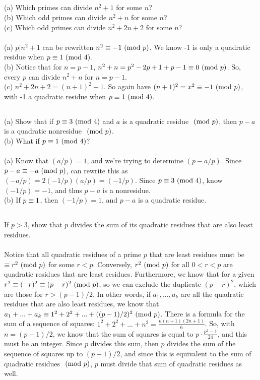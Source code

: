 \documentclass{article} \usepackage{amsmath}
\begin{document}
\subsection{}
(a) Which primes can divide $n^2 + 1$ for some $n$?\\
(b) Which odd primes can divide $n^2 + n$ for some $n$?\\
(c) Which odd primes can divide $n^2 + 2n + 2$ for some $n$?\\~\\
(a) $p|n^2 + 1$ can be rewritten $n^2 \equiv -1 \ (\mathrm{mod}\ p)$.
We know -1 is only a quadratic residue when $p \equiv 1 \ (\mathrm{mod}\ 4)$.\\
(b) Notice that for $n = p - 1$, $n^2 + n = p^2 - 2p + 1 + p - 1 \equiv 0 \ (\mathrm{mod}\ p)$.
So, every $p$ can divide $n^2 + n$ for $n = p - 1$.\\
(c) $n^2 + 2n + 2 = (n + 1)^2 + 1$.
So again have $(n + 1)^2 = x^2 \equiv -1 \ (\mathrm{mod}\ p)$, with -1 a quadratic residue
when $p \equiv 1 \ (\mathrm{mod}\ 4)$.

\subsection{}
(a) Show that if $p \equiv 3 \ (\mathrm{mod}\ 4)$ and $a$ is a quadratic residue $\ (\mathrm{mod}\ p)$,
then $p - a$ is a quadratic nonresidue $\ (\mathrm{mod}\ p)$.\\
(b) What if $p \equiv 1 \ (\mathrm{mod}\ 4)$?\\~\\
(a) Know that $(a/p) = 1$, and we're trying to determine $(p - a/p)$.
Since $p - a \equiv -a \ (\mathrm{mod}\ p)$, can rewrite this as $(-a/p) = 2(-1/p)(a/p) = (-1/p)$.
Since $p \equiv 3 \ (\mathrm{mod}\ 4)$, know $(-1/p) = -1$, and thus $p - a$ is a nonresidue.\\
(b) If $p \equiv 1$, then $(-1/p) = 1$, and $p - a$ is a quadratic residue.

\subsection{}
If $p > 3$, show that $p$ divides the sum of its quadratic residues that are
also least residues.\\~\\
Notice that all quadratic residues of a prime $p$ that are least residues must
be $\equiv r^2 \ (\mathrm{mod}\ p)$ for some $r < p$.
Conversely, $r^2 \ (\mathrm{mod}\ p)$ for all $0 < r < p$ are quadratic residues that are
least residues.
Furthermore, we know that for a given $r^2 \equiv (-r)^2 \equiv (p - r)^2 \ (\mathrm{mod}\ p)$,
so we can exclude the duplicate $(p - r)^2$, which are those for
$r > (p - 1)/2$.
In other words, if $a_1, ..., a_k$ are all the quadratic residues that are
also least residues, we know that
$a_1 + ... + a_k \equiv 1^2 + 2^2 + ... + ((p - 1)/2)^2 \ (\mathrm{mod}\ p)$.
There is a formula for the sum of a sequence of squares:
$1^2 + 2^2 + ... + n^2 = \frac{n(n + 1)(2n + 1)}{6}$.
So, with $n = (p - 1)/2$, we know that the sum of squares is equal to
$p \cdot \frac{p^2 - 1}{24}$, and this must be an integer.
Since $p$ divides this sum, then $p$ divides the sum of the sequence of squares
up to $(p - 1)/2$, and since this is equivalent to the sum of quadratic residues
$\ (\mathrm{mod}\ p)$, $p$ must divide that sum of quadratic residues as well.
\end{document}
